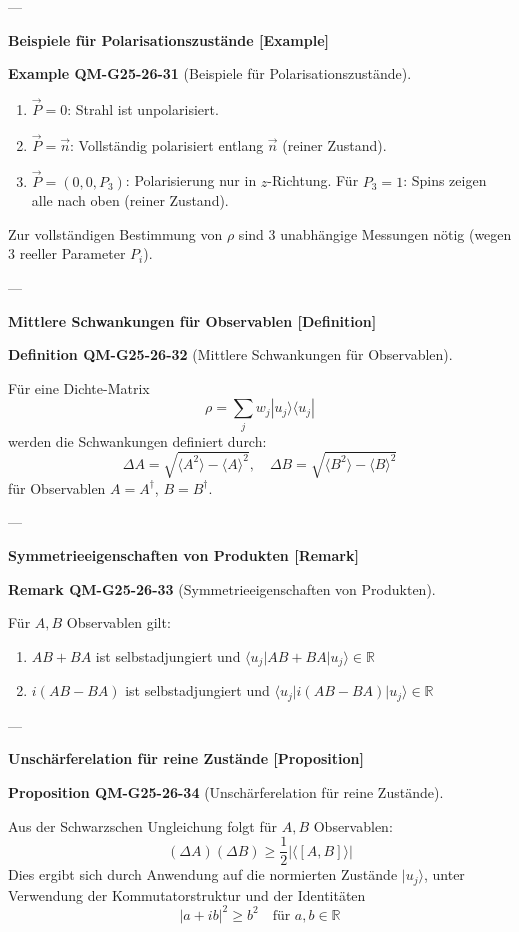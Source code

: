 \documentclass[10pt, letterpaper]{article}
\newcommand{\CustomHeading}[3]{%
  \par\medskip\noindent%
  \textbf{#1 #2} \textnormal{(#3)}.\enskip%
}
\newenvironment{DEF}[2]{\begin{unitbox}\CustomHeading{Definition}{#1}{#2}}{\end{unitbox}}
\newenvironment{PROP}[2]{\begin{unitbox}\CustomHeading{Proposition}{#1}{#2}}{\end{unitbox}}
\newenvironment{REM}[2]{\begin{unitbox}\CustomHeading{Remark}{#1}{#2}}{\end{unitbox}}
\newenvironment{EXA}[2]{\begin{unitbox}\CustomHeading{Example}{#1}{#2}}{\end{unitbox}}
\begin{document}
---

\textbf{Beispiele für Polarisationszustände [Example]}

\begin{EXA}{QM-G25-26-31}{Beispiele für Polarisationszustände}
\begin{enumerate}
  \item $\vec{P} = 0$: Strahl ist unpolarisiert.
  \item $\vec{P} = \vec{n}$: Vollständig polarisiert entlang $\vec{n}$ (reiner Zustand).
  \item $\vec{P} = (0, 0, P_3)$: Polarisierung nur in $z$-Richtung. Für $P_3 = 1$: Spins zeigen alle nach oben (reiner Zustand).
\end{enumerate}

Zur vollständigen Bestimmung von $\rho$ sind 3 unabhängige Messungen nötig (wegen 3 reeller Parameter $P_i$).
\end{EXA}

---

\textbf{Mittlere Schwankungen für Observablen [Definition]}

\begin{DEF}{QM-G25-26-32}{Mittlere Schwankungen für Observablen}
Für eine Dichte-Matrix
\[
\rho = \sum_j w_j |u_j\rangle \langle u_j|
\]
werden die Schwankungen definiert durch:
\[
\Delta A = \sqrt{\langle A^2 \rangle - \langle A \rangle^2}, \quad
\Delta B = \sqrt{\langle B^2 \rangle - \langle B \rangle^2}
\]
für Observablen $A = A^\dagger$, $B = B^\dagger$.
\end{DEF}

---

\textbf{Symmetrieeigenschaften von Produkten [Remark]}

\begin{REM}{QM-G25-26-33}{Symmetrieeigenschaften von Produkten}
Für $A, B$ Observablen gilt:
\begin{enumerate}
  \item $AB + BA$ ist selbstadjungiert und $\langle u_j | AB + BA | u_j \rangle \in \mathbb{R}$
  \item $i(AB - BA)$ ist selbstadjungiert und $\langle u_j | i(AB - BA) | u_j \rangle \in \mathbb{R}$
\end{enumerate}
\end{REM}

---

\textbf{Unschärferelation für reine Zustände [Proposition]}

\begin{PROP}{QM-G25-26-34}{Unschärferelation für reine Zustände}
Aus der Schwarzschen Ungleichung folgt für $A, B$ Observablen:
\[
(\Delta A)(\Delta B) \geq \frac{1}{2} |\langle [A, B] \rangle|
\]
Dies ergibt sich durch Anwendung auf die normierten Zustände $|u_j\rangle$, unter Verwendung der Kommutatorstruktur und der Identitäten
\[
|a + i b|^2 \geq b^2 \quad \text{für } a, b \in \mathbb{R}
\]
\end{PROP}
\end{document}
